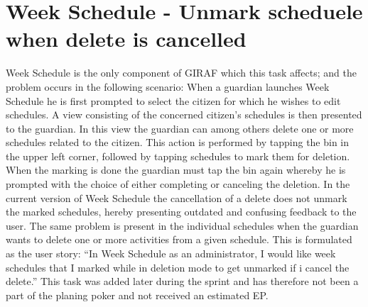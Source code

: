 \section{Week Schedule - Unmark scheduele when delete is cancelled}
Week Schedule is the only component of GIRAF which this task affects; and the problem occurs in the following scenario:
When a guardian launches Week Schedule he is first prompted to select the citizen for which he wishes to edit schedules.
A view consisting of the concerned citizen's schedules is then presented to the guardian.
In this view the guardian can among others delete one or more schedules related to the citizen.
This action is performed by tapping the bin in the upper left corner, followed by tapping schedules to mark them for deletion.
When the marking is done the guardian must tap the bin again whereby he is prompted with the choice of either completing or canceling the deletion.
In the current version of Week Schedule the cancellation of a delete does not unmark the marked schedules, hereby presenting outdated and confusing feedback to the user.
The same problem is present in the individual schedules when the guardian wants to delete one or more activities from a given schedule.
This is formulated as the user story: ``In Week Schedule as an administrator, I would like week schedules that I marked while in deletion mode to get unmarked if i cancel the delete.''
This task was added later during the sprint and has therefore not been a part of the planing poker and not received an estimated EP. 

